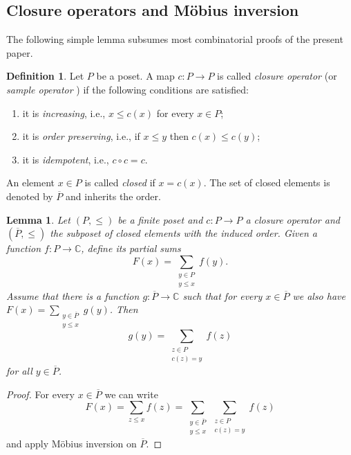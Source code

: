 \documentclass[12pt]{amsart}
\newcommand\IC{{\mathbb C}}
\newtheorem{lemma}[theorem]{Lemma}
\theoremstyle{definition}
\newtheorem{definition}[theorem]{Definition}
\numberwithin{equation}{section}
\begin{document}
\subsection{Closure operators and Möbius inversion}
The following simple lemma subsumes most combinatorial proofs
of the present paper.
\begin{definition}
  Let $P$ be a poset. A map $c:P\to P$ is called \emph{closure operator}
 (or   \emph{sample operator}  \cite {BarnabeiBriniRota:1986:moebius})
  if the following conditions are satisfied:
  \begin{enumerate}[label=(\roman*)]
   \item it is \emph{increasing}, i.e., $x\leq c(x)$ for every $x\in P$; 
   \item it is \emph{order preserving}, i.e., if $x\leq y$ then $c(x)\leq c(y)$; 
   \item it is \emph{idempotent}, i.e., $c\circ c=c$.
  \end{enumerate}
  An element $x\in P$ is called \emph{closed} if $x=c(x)$.
  The set of closed elements is denoted by $\overline{P}$
  and inherits the order.
\end{definition}

\begin{lemma}\label{lem:closure}
  Let $(P,\leq)$ be a finite poset and $c:P\to P$ a closure operator
  and $(\overline{P},\leq)$ the subposet of closed elements with the induced order.
  Given a function $f:P\to \IC$,  define its partial sums
  $$
  F(x) = \sum_{\substack{y\in P\\ y\leq x}} f(y)
  .
  $$
  Assume that there is a function $g:\overline{P}\to \IC$
  such that for every $x\in\overline{P}$ we also have
  $F(x) = \sum_{ 
    \substack{y\in \overline{P}\\ y\leq x}} g(y)$.
  Then
  $$
  g(y) = \sum_{\substack{z\in P\\ c(z)=y}} f(z)
  $$
   for all $y\in\overline{P}$.
\end{lemma}

\begin{proof}
   For every $x\in \overline{P}$ we can write
  $$
  F(x) 
  = \sum_{z\leq x} f(z)
  = \sum_{\substack{y\in\overline{P}\\ y\leq x}} \sum_{\substack{z\in P\\ c(z)=y}}f(z)
  $$
  and apply M\"obius inversion on $\overline{P}$.
    
  \end{proof}

\end{document}

